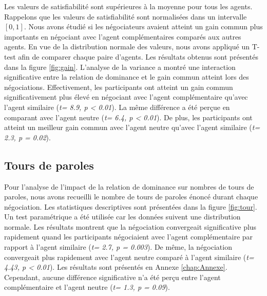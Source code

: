 	Les valeurs de satisfiabilité sont supérieures à la moyenne pour tous les agents. Rappelons que les valeurs de satisfiabilité sont normalisées dans un intervalle $[0, 1]$. Nous avons étudié si les négociateurs avaient atteint un gain commun plus importants en négociant avec l'agent complémentaires comparés aux autres agents. En vue de la distribution normale des valeurs, nous avons appliqué un T-test afin de comparer chaque paire d'agents. Les résultats obtenus sont présentés dans la figure \ref{fig:gain}. L'analyse de la variance a montré une interaction significative entre la relation de dominance et le gain commun atteint lors des négociations. Effectivement, les participants ont atteint un gain commun significativement plus élevé en négociant avec l'agent complémentaire qu'avec l'agent similaire (\emph{t= 8.9, p < 0.01}). La même différence a été perçue en comparant avec l'agent neutre (\emph{t= 6.4, p < 0.01}).
	De plus, les participants ont atteint un meilleur gain commun avec l'agent neutre qu'avec l'agent similaire (\emph{t= 2.3, p = 0.02}).
	

	
	\subsection{Tours de paroles}
	
	Pour l'analyse de l'impact de la relation de dominance sur nombres de tours de paroles, nous avons recueilli le nombre de tours de paroles énoncé durant chaque négociation. Les statistiques descriptives sont présentées dans la figure \ref{fig:tour}. Un test paramétrique a été utilisée car les données suivent une distribution normale. Les résultats montrent que la négociation convergeait significative plus rapidement quand les participants négociaient avec l'agent complémentaire par rapport à l'agent similaire (\emph{t= 2.7, p = 0.003}). De même, la négociation convergeait plus rapidement avec l'agent neutre comparé à l'agent similaire (\emph{t= 4.43, p < 0.01}).  Les résultats sont présentés en Annexe \ref{chap:Annexe}.
	Cependant, aucune différence significative n'a été perçu entre l'agent complémentaire et l'agent neutre (\emph{t= 1.3, p = 0.09}).  
	

